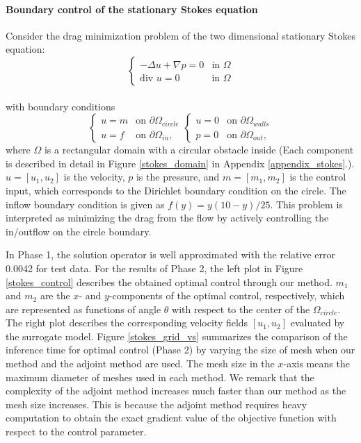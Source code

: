 \documentclass[letterpaper]{article}
\begin{document}
\paragraph{Boundary control of the stationary Stokes equation}
Consider the drag minimization problem of the two dimensional stationary Stokes equation:  
\begin{equation}\label{stokes_governing}
  \begin{cases}
        - \Delta u + \nabla p = 0 & \text{in } \Omega\\
    \text{div } u = 0 & \text{in } \Omega
  \end{cases}
\end{equation}\\
with boundary conditions
\begin{equation}
    \begin{cases}
        u = m & \text{on } \partial \Omega_{circle} \\
        u = f & \text{on } \partial \Omega_{in}, 
    \end{cases}
    \begin{cases}
        u = 0 & \text{on } \partial \Omega_{walls} \\ 
        p = 0 & \text{on } \partial \Omega_{out},
    \end{cases}
\end{equation}
where $\Omega$ is a rectangular domain with a circular obstacle inside (Each component is described in detail in Figure \ref{stokes_domain} in Appendix \ref{appendix_stokes}.). 
$u = [u_1, u_2]$ is the velocity, $p$ is the pressure, and $m = [m_1, m_2]$ is the control input, which corresponds to the Dirichlet boundary condition on the circle. The inflow boundary condition is given as $f(y) = y(10-y)/25$. This problem is interpreted as minimizing the drag from the flow by actively controlling the in/outflow on the circle boundary. 

In Phase 1, the solution operator is well approximated with the relative error 0.0042 for test data. For the results of Phase 2, the left plot in Figure \ref{stokes_control} describes the obtained optimal control through our method. $m_1$ and $m_2$ are the $x$- and $y$-components of the optimal control, respectively, which are represented as functions of angle $\theta$ with respect to the center of the $\Omega_{circle}$. The right plot describes the corresponding velocity fields $[u_1, u_2]$ evaluated by the surrogate model. 
Figure \ref{stokes_grid_vs} summarizes the comparison of the inference time for optimal control (Phase 2) by varying the size of mesh when our method and the adjoint method are used. The mesh size in the $x$-axis means the maximum diameter of meshes used in each method. We remark that the complexity of the adjoint method increases much faster than our method as the mesh size increases. This is because the adjoint method requires heavy computation to obtain the exact gradient value of the objective function with respect to the control parameter.
\end{document}
